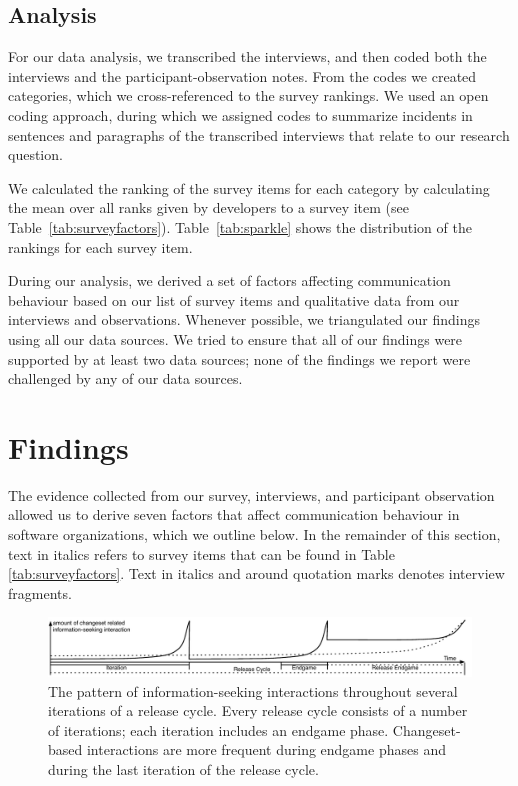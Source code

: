 \subsection{Analysis} 
For our data analysis, we transcribed the interviews, and then coded both the interviews and the participant-observation notes. From the codes we created categories, which we cross-referenced to the survey rankings. We used an open coding approach, during which we assigned codes to summarize incidents in sentences and paragraphs of the transcribed interviews that relate to our research question.

We calculated the ranking of the survey items for each category by calculating the mean over all ranks given by developers to a survey item (see Table~\ref{tab:surveyfactors}).
Table~\ref{tab:sparkle} shows the distribution of the rankings for each survey item.

During our analysis, we derived a set of factors affecting communication behaviour based on our list of survey items and qualitative data from our interviews and observations. Whenever possible, we triangulated our findings using all our data sources. We tried to ensure that all of our findings were supported by at least two data sources; none of the findings we report were challenged by any of our data sources. 


\section{Findings}
\label{sec:findings}
The evidence collected from our survey, interviews, and participant observation allowed us to derive seven factors that affect communication behaviour in software organizations, which we outline below. In the remainder of this section, text in italics refers to survey items that can be found in Table \ref{tab:surveyfactors}. Text in italics and around quotation marks denotes interview fragments.

\begin{figure}[tb]
\centering
\includegraphics[width=\textwidth]{figures/findingProcess2}
\vspace{-20pt}\caption{The pattern of information-seeking interactions throughout several iterations of a release cycle. Every release cycle consists of a number of iterations; each iteration includes an endgame phase. Changeset-based interactions are more frequent during endgame phases and during the last iteration of the release cycle.}
\label{IterationsFig}
\end{figure}



